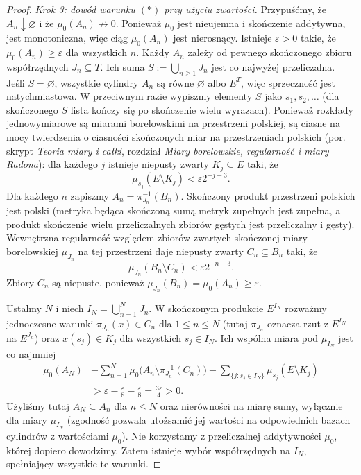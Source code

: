 \begin{proof}
\emph{Krok 3: dowód warunku $(*)$ przy użyciu zwartości.}
Przypuśćmy, że $A_n\downarrow\varnothing$ i że
$\mu_0(A_n)\not\to0$. Ponieważ $\mu_0$ jest nieujemna i skończenie addytywna,
jest monotoniczna, więc ciąg $\mu_0(A_n)$ jest nierosnący. Istnieje $\varepsilon>0$ takie, że
$\mu_0(A_n)\ge\varepsilon$ dla wszystkich $n$.
Każdy $A_n$ zależy od pewnego skończonego zbioru
współrzędnych $J_n\subseteq T$. Ich suma
$S:=\bigcup_{n\ge1}J_n$ jest co najwyżej przeliczalna.
Jeśli $S=\varnothing$, wszystkie cylindry $A_n$ są
równe $\varnothing$ albo $E^T$, więc sprzeczność jest
natychmiastowa. W przeciwnym razie wypiszmy elementy
$S$ jako $s_1,s_2,\ldots$ (dla skończonego $S$
lista kończy się po skończenie wielu wyrazach). Ponieważ rozkłady
jednowymiarowe są miarami borelowskimi na przestrzeni
polskiej, są ciasne na mocy twierdzenia o ciasności
skończonych miar na przestrzeniach polskich
(por. skrypt \emph{Teoria miary i całki}, rozdział
\emph{Miary borelowskie, regularność i miary Radona}): dla każdego $j$ istnieje niepusty
zwarty $K_j\subseteq E$ taki, że
\[
\mu_{s_j}(E\setminus K_j)<\varepsilon2^{-j-3}.
\tag{1}
\]
Dla każdego $n$ zapiszmy $A_n=\pi_{J_n}^{-1}(B_n)$.
Skończony produkt przestrzeni polskich jest polski
(metryka będąca skończoną sumą metryk zupełnych jest
zupełna, a produkt skończenie wielu przeliczalnych
zbiorów gęstych jest przeliczalny i gęsty).
Wewnętrzna regularność względem zbiorów zwartych
skończonej miary borelowskiej $\mu_{J_n}$ na tej
przestrzeni daje niepusty zwarty
$C_n\subseteq B_n$ taki, że
\[
\mu_{J_n}(B_n\setminus C_n)<\varepsilon2^{-n-3}.
\tag{2}
\]
Zbiory $C_n$ są niepuste, ponieważ
$\mu_{J_n}(B_n)=\mu_0(A_n)\ge\varepsilon$.

Ustalmy $N$ i niech $I_N=\bigcup_{n=1}^N J_n$.
W skończonym produkcie $E^{I_N}$ rozważmy jednoczesne
warunki $\pi_{J_n}(x)\in C_n$ dla $1\le n\le N$
(tutaj $\pi_{J_n}$ oznacza rzut z $E^{I_N}$ na $E^{J_n}$)
oraz $x(s_j)\in K_j$ dla wszystkich $s_j\in I_N$.
Ich wspólna miara pod $\mu_{I_N}$ jest co najmniej
\[
\begin{aligned}
\mu_0(A_N)
&-\sum_{n=1}^N \mu_0\big(A_n\setminus\pi_{J_n}^{-1}(C_n)\big)
-\sum_{\{j:s_j\in I_N\}}\mu_{s_j}(E\setminus K_j)\\
&>\varepsilon-\frac\varepsilon8-\frac\varepsilon8
=\frac{3\varepsilon}{4}>0.
\end{aligned}
\tag{3}
\]
Użyliśmy tutaj $A_N\subseteq A_n$ dla $n\le N$ oraz
nierówności na miarę sumy, wyłącznie dla miary
$\mu_{I_N}$ (zgodność pozwala utożsamić jej wartości
na odpowiednich bazach cylindrów z wartościami $\mu_0$).
Nie korzystamy z przeliczalnej addytywności $\mu_0$,
której dopiero dowodzimy. Zatem istnieje wybór
współrzędnych na $I_N$, spełniający wszystkie te warunki.


\end{proof}

